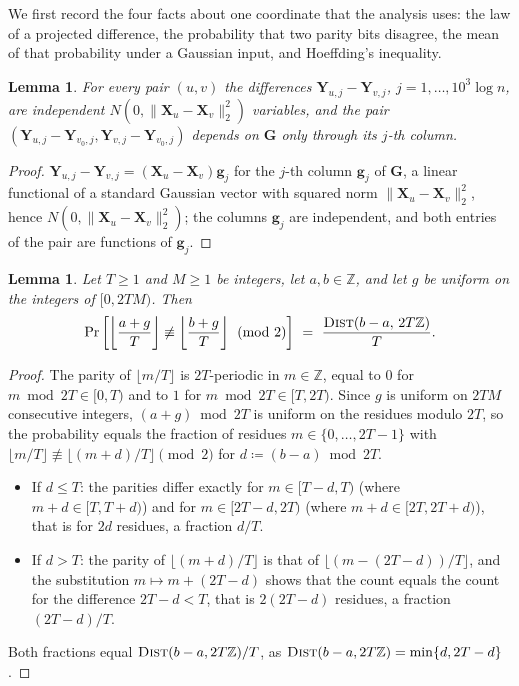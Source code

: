 \documentclass[11pt]{article}
\newtheorem{lemma}[theorem]{Lemma}
\theoremstyle{remark}
\renewcommand{\gg}{{\mathbf g}}
\newcommand{\GG}{\mathbf G}
\newcommand{\XX}{\mathbf X}
\newcommand{\YY}{\mathbf{Y}}
\newcommand{\defeq}{\coloneqq}
\newcommand{\norm}[1]{\lVert#1\rVert}
\newcommand{\Z}{\mathbb Z}
\newcommand{\dist}{\textsc{Dist}}
\begin{document}
We first record the four facts about one coordinate that the analysis
uses: the law of a projected difference, the probability that two parity
bits disagree, the mean of that probability under a Gaussian input, and
Hoeffding's inequality.

\begin{lemma}\label{lem:packed-law}
For every pair $(u,v)$ the differences $\YY_{u,j}-\YY_{v,j}$,
$j=1,\dots,10^{3}\log n$, are independent $N(0,\norm{\XX_u-\XX_v}_2^{2})$
variables, and the pair $(\YY_{u,j}-\YY_{v_0,j},\YY_{v,j}-\YY_{v_0,j})$
depends on
$\GG$ only through its $j$-th column.
\end{lemma}
\begin{proof}
$\YY_{u,j}-\YY_{v,j}=(\XX_u-\XX_v)\gg_j$ for the $j$-th column $\gg_j$ of $\GG$,
a linear functional of a standard Gaussian vector with squared norm
$\norm{\XX_u-\XX_v}_2^{2}$, hence $N(0,\norm{\XX_u-\XX_v}_2^{2})$; the columns
$\gg_j$ are independent, and both entries of the pair are functions of
$\gg_j$.
\end{proof}

\begin{lemma}\label{lem:packed-parity}
Let $T\ge1$ and $M\ge1$ be integers, let $a,b\in\Z$, and let $g$ be uniform
on the integers of $[0,2TM)$.
Then
\[
\Pr\left[\left\lfloor\frac{a+g}{T}\right\rfloor\not\equiv
\left\lfloor\frac{b+g}{T}\right\rfloor\pmod 2\right]
\ =\ \frac{\dist(b-a,\,2T\Z)}{T}.
\]
\end{lemma}
\begin{proof}
The parity of $\lfloor m/T\rfloor$ is $2T$-periodic in $m\in\Z$, equal to
$0$ for $m\bmod2T\in[0,T)$ and to $1$ for $m\bmod2T\in[T,2T)$.
Since $g$ is uniform on $2TM$ consecutive integers, $(a+g)\bmod2T$ is
uniform on the residues modulo $2T$, so the probability equals the
fraction of residues $m\in\{0,\dots,2T-1\}$ with
$\lfloor m/T\rfloor\not\equiv\lfloor(m+d)/T\rfloor\pmod2$ for
$d\defeq(b-a)\bmod2T$.
\begin{itemize}[leftmargin=*]
\item If $d\le T$: the parities differ exactly for $m\in[T-d,T)$ (where
$m+d\in[T,T+d)$) and for $m\in[2T-d,2T)$ (where $m+d\in[2T,2T+d)$), that is
for $2d$ residues, a fraction $d/T$.
\item If $d>T$: the parity of $\lfloor(m+d)/T\rfloor$ is that of
$\lfloor(m-(2T-d))/T\rfloor$, and the substitution $m\mapsto m+(2T-d)$ shows
that the count equals the count for the difference $2T-d<T$, that is
$2(2T-d)$ residues, a fraction $(2T-d)/T$.
\end{itemize}
Both fractions equal $\dist(b-a,2T\Z)/T$, as
$\dist(b-a,2T\Z)=\min\{d,2T-d\}$.
\end{proof}
\end{document}
